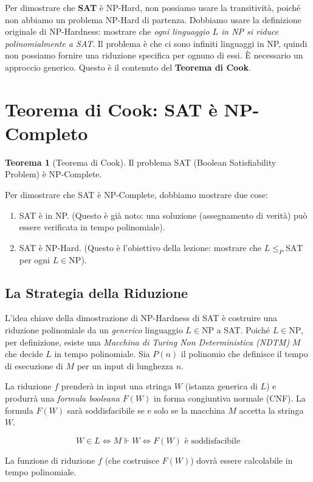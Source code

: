 \documentclass[a4paper]{article}
\theoremstyle{definition} %
\newtheorem{theorem}{Teorema}
\begin{document}
Per dimostrare che \textbf{SAT} è NP-Hard, non possiamo usare la transitività, poiché non abbiamo un problema NP-Hard di partenza. Dobbiamo usare la definizione originale di NP-Hardness: mostrare che \emph{ogni linguaggio $L$ in NP si riduce polinomialmente a SAT}.
Il problema è che ci sono infiniti linguaggi in NP, quindi non possiamo fornire una riduzione specifica per ognuno di essi. È necessario un approccio generico. Questo è il contenuto del \textbf{Teorema di Cook}.

\section{Teorema di Cook: SAT è NP-Completo}

\begin{theorem}[Teorema di Cook]
Il problema SAT (Boolean Satisfiability Problem) è NP-Complete.
\end{theorem}

Per dimostrare che SAT è NP-Complete, dobbiamo mostrare due cose:
\begin{enumerate}
    \item SAT è in NP. (Questo è già noto: una soluzione (assegnamento di verità) può essere verificata in tempo polinomiale).
    \item SAT è NP-Hard. (Questo è l'obiettivo della lezione: mostrare che $L \le_P \text{SAT}$ per ogni $L \in \text{NP}$).
\end{enumerate}

\subsection{La Strategia della Riduzione}
L'idea chiave della dimostrazione di NP-Hardness di SAT è costruire una riduzione polinomiale da un \emph{generico} linguaggio $L \in \text{NP}$ a SAT.
Poiché $L \in \text{NP}$, per definizione, esiste una \emph{Macchina di Turing Non Deterministica (NDTM)} $M$ che decide $L$ in tempo polinomiale. Sia $P(n)$ il polinomio che definisce il tempo di esecuzione di $M$ per un input di lunghezza $n$.

La riduzione $f$ prenderà in input una stringa $W$ (istanza generica di $L$) e produrrà una \emph{formula booleana} $F(W)$ in forma congiuntiva normale (CNF). La formula $F(W)$ sarà soddisfacibile se e solo se la macchina $M$ accetta la stringa $W$.

\[ W \in L \iff M \Vdash W \iff F(W) \text{ è soddisfacibile} \]

La funzione di riduzione $f$ (che costruisce $F(W)$) dovrà essere calcolabile in tempo polinomiale.
\end{document}
